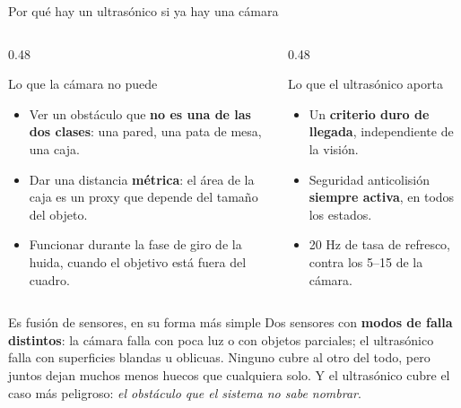 \documentclass[aspectratio=169,10pt]{beamer}
\begin{document}
\begin{frame}{Por qué hay un ultrasónico si ya hay una cámara}
  \begin{columns}[T,onlytextwidth]
    \begin{column}{0.48\textwidth}
      \begin{block}{Lo que la cámara no puede}
        \small
        \begin{itemize}
          \item Ver un obstáculo que \textbf{no es una de las dos clases}: una
                pared, una pata de mesa, una caja.
          \item Dar una distancia \textbf{métrica}: el área de la caja es un
                proxy que depende del tamaño del objeto.
          \item Funcionar durante la fase de giro de la huida, cuando el objetivo
                está fuera del cuadro.
        \end{itemize}
      \end{block}
    \end{column}
    \begin{column}{0.48\textwidth}
      \begin{block}{Lo que el ultrasónico aporta}
        \small
        \begin{itemize}
          \item Un \textbf{criterio duro de llegada}, independiente de la visión.
          \item Seguridad anticolisión \textbf{siempre activa}, en todos los
                estados.
          \item 20 Hz de tasa de refresco, contra los 5--15 de la cámara.
        \end{itemize}
      \end{block}
    \end{column}
  \end{columns}

  \vspace{0.7em}
  \begin{alertblock}{Es fusión de sensores, en su forma más simple}
    \small
    Dos sensores con \textbf{modos de falla distintos}: la cámara falla con poca
    luz o con objetos parciales; el ultrasónico falla con superficies blandas u
    oblicuas. Ninguno cubre al otro del todo, pero juntos dejan muchos menos
    huecos que cualquiera solo. Y el ultrasónico cubre el caso más peligroso:
    \emph{el obstáculo que el sistema no sabe nombrar}.
  \end{alertblock}
\end{frame}
\end{document}
